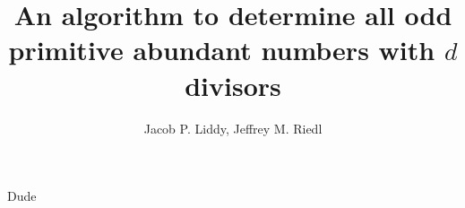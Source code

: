 \documentclass[12pt]{article}
\title{An algorithm to determine all odd primitive abundant
numbers with $d$ divisors}
\author{Jacob P. Liddy, Jeffrey M. Riedl}
\numberwithin{theorem}{section}
\numberwithin{coro}{section}
\begin{document}
\maketitle










Dude\cite{Amato}




\end{document}
